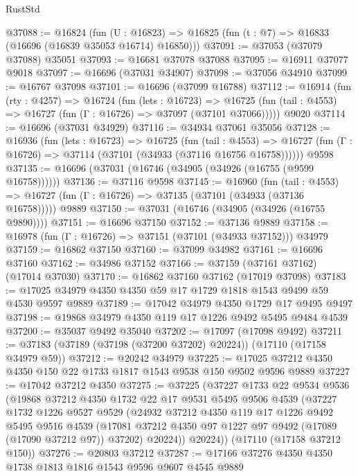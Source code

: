 \begin{lexlean}{RustStd}
\begin{coremodule}
@37088 := @16824
    (fun (U : @16823) => @16825 (fun (t : @7) => @16833 (@16696 (@16839 @35053 @16714) @16850)))
@37091 := @37053 (@37079 @37088) @35051
@37093 := @16681 @37078 @37088
@37095 := @16911 @37077 @9018
@37097 := @16696 (@37031 @34907)
@37098 := @37056 @34910
@37099 := @16767 @37098
@37101 := @16696 (@37099 @16788)
@37112 := @16914
    (fun (rty : @4257) =>
    @16724
      (fun (lets : @16723) =>
      @16725 (fun (tail : @4553) => @16727 (fun (Γ : @16726) => @37097 (@37101 @37066)))))
    @9020
@37114 := @16696 (@37031 @34929)
@37116 := @34934 @37061 @35056
@37128 := @16936
    (fun (lets : @16723) =>
    @16725
      (fun (tail : @4553) =>
      @16727 (fun (Γ : @16726) => @37114 (@37101 (@34933 (@37116 @16756 @16758))))))
    @9598
@37135 := @16696 (@37031 (@16746 (@34905 (@34926 (@16755 (@9599 @16758))))))
@37136 := @37116 @9598
@37145 := @16960
    (fun (tail : @4553) => @16727 (fun (Γ : @16726) => @37135 (@37101 (@34933 (@37136 @16758)))))
    @9889
@37150 := @37031 (@16746 (@34905 (@34926 (@16755 @9890))))
@37151 := @16696 @37150
@37152 := @37136 @9889
@37158 := @16978 (fun (Γ : @16726) => @37151 (@37101 (@34933 @37152))) @34979
@37159 := @16862 @37150
@37160 := @37099 @34982
@37161 := @16696 @37160
@37162 := @34986 @37152
@37166 := @37159 (@37161 @37162) (@17014 @37030)
@37170 := @16862 @37160 @37162 (@17019 @37098)
@37183 := @17025 @34979 @4350 @4350 @59 @17 @1729 @1818 @1543 @9499 @59 @4530 @9597 @9889
@37189 := @17042 @34979 @4350 @1729 @17 @9495 @9497
@37198 := @19868 @34979 @4350 @119 @17 @1226 @9492 @5495 @9484 @4539
@37200 := @35037 @9492 @35040
@37202 := @17097 (@17098 @9492)
@37211 := @37183 (@37189 (@37198 (@37200 @37202) @20224)) (@17110 (@17158 @34979 @59))
@37212 := @20242 @34979
@37225 := @17025 @37212 @4350 @4350 @150 @22 @1733 @1817 @1543 @9538 @150 @9502 @9596 @9889
@37227 := @17042 @37212 @4350
@37275 := @37225
    (@37227
      @1733
      @22
      @9534
      @9536
      (@19868
        @37212
        @4350
        @1732
        @22
        @17
        @9531
        @5495
        @9506
        @4539
        (@37227
          @1732
          @1226
          @9527
          @9529
          (@24932
            @37212
            @4350
            @119
            @17
            @1226
            @9492
            @5495
            @9516
            @4539
            (@17081 @37212 @4350 @97 @1227 @97 @9492 (@17089 (@17090 @37212 @97)) @37202)
            @20224))
        @20224))
    (@17110 (@17158 @37212 @150))
@37276 := @20803 @37212
@37287 := @17166 @37276 @4350 @4350 @1738 @1813 @1816 @1543 @9596 @9607 @4545 @9889

\end{coremodule}
\end{lexlean}

